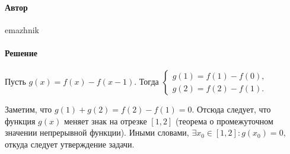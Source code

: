 \documentclass{article}
\begin{document}
\paragraph{Автор} emazhnik
\paragraph{Решение} Пусть $g(x) = f(x) - f(x-1)$. Тогда
$\begin{cases}
g(1) = f(1) - f(0), \\
g(2) = f(2) - f(1).
\end{cases}$

Заметим, что $g(1) + g(2) = f(2) - f(1) = 0$. Отсюда следует, что функция $g(x)$ меняет знак на отрезке $[1,2]$ (теорема о промежуточном значении непрерывной функции).
Иными словами, $\exists x_0 \in [1,2]: g(x_0)=0$, откуда следует утверждение задачи.
\end{document}
